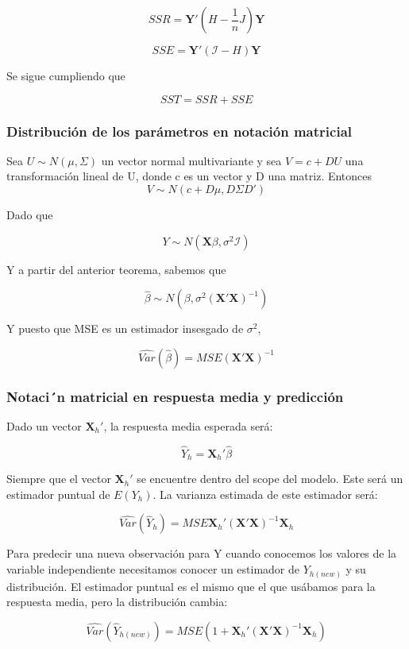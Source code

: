 $$
SSR= \mathbf{Y'}\left(H-\frac{1}{n}J\right)\mathbf{Y}
$$

$$
SSE= \mathbf{Y'}\left(\mathcal{I}-H\right)\mathbf{Y}
$$

Se sigue cumpliendo que 

$$
SST=SSR+SSE
$$

\subsubsection{Distribución de los parámetros en notación matricial}

\begin{theorem}
    Sea $U\sim N(\mu,\Sigma)$ un vector normal multivariante y sea $V =c+DU$ una transformación lineal de U, donde c es un vector y D una matriz. Entonces
    $$
    V\sim N\left(c+D\mu,D\Sigma D'\right)
    $$
\end{theorem}

Dado que 

$$
Y\sim N(\mathbf{X}\beta, \sigma^2\mathcal{I})
$$

Y a partir del anterior teorema, sabemos que 

$$
\hat\beta\sim N(\beta, \sigma^2(\mathbf{X'X})^{-1})
$$

Y puesto que MSE es un estimador insesgado de $\sigma^2$,

$$
\hat{Var}(\hat\beta)=MSE(\mathbf{X'X})^{-1}
$$

\subsubsection{Notaci´n matricial en respuesta media y predicción}

Dado un vector $\mathbf{X}_h'$, la respuesta media esperada será:

$$
\hat Y_h=\mathbf{X}_h'\hat\beta
$$

Siempre que el vector $\mathbf{X}_h'$ se encuentre dentro del scope del modelo. Este será un estimador puntual de $E(Y_h)$. La varianza estimada de este estimador será:

$$
\hat{Var}(\hat Y_h)=MSE\mathbf{X}_h'(\mathbf{X'X})^{-1}\mathbf{X}_h
$$

Para predecir una nueva observación para Y cuando conocemos los valores de la variable independiente necesitamos conocer un estimador de $Y_{h(new)}$ y su distribución. El estimador puntual es el mismo que el que usábamos para la respuesta media, pero la distribución cambia:

$$
\hat{Var}(\hat Y_{h(new)})=MSE(1+\mathbf{X}_h'(\mathbf{X'X})^{-1}\mathbf{X}_h)
$$

